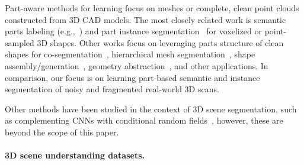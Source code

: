 Part-aware methods for learning  focus on meshes or complete, clean point clouds constructed from 3D CAD models. The most closely related work  is semantic parts labeling (e.g.,~\cite{yi2016scalable,wang2017cnn,qi2017pointnet,mo2019partnet,yi2019gspn,zhang2019point}) and part instance segmentation~\cite{zhang2019point} for voxelized or point-sampled 3D shapes. Other works focus on leveraging parts structure of clean shapes for co-segmentation~\cite{chen2019bae,zhu2019cosegnet}, hierarchical mesh segmentation~\cite{yi2017learning}, shape assembly/generation~\cite{mo2019structurenet,wu2019sagnet,wu2019pq,mo2020pt2pc}, geometry abstraction~\cite{russell2009associative,li2017grass,sun2019learning}, and other applications.
In comparison, our focus is on learning part-based semantic and instance segmentation of noisy and fragmented real-world 3D scans. 

Other methods have been studied in the context of 3D scene segmentation, such as complementing CNNs with conditional random fields~\cite{pham2019jsis3d,pham2019real,wang2017cnn}, however, these are beyond the scope of this paper.


\paragraph{3D scene understanding datasets.}
\label{related:datasets}



